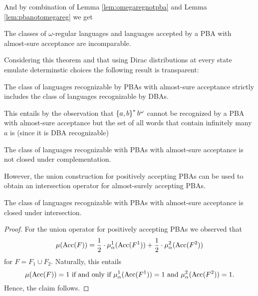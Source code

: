And by combination of Lemma \ref{lem:omegaregnotpba} and Lemma 
\ref{lem:pbanotomegareg} we get
\begin{theorem}
  \cite[Theorem 4, (b), (c)]{DecProblemsForProbAuto}
  The classes of $\omega$-regular languages and languages accepted by a 
  \ac{PBA} with almost-sure acceptance are incomparable.
  \label{thm:regalmostsureincomparable}
\end{theorem}
Considering this theorem and that using Dirac distributions at every state 
emulate determinstic choices the following result is transparent:
\begin{proposition}
  \cite[Proof of Theorem 4.4.9 (d)]{Groesser}
  The class of languages recognizable by \acp{PBA} with almost-sure acceptance
  strictly includes the class of languages recognizable by \acp{DBA}.
  \label{prop:pbasubsumesdba}
\end{proposition}
This entails by the observation that $\left\{a,b\right\}^{*}b^{\omega}$ cannot be 
recognized by a \ac{PBA} with almost-sure acceptance but the set of all words 
that contain infinitely many $a$ is (since it is \ac{DBA} recognizable)
\begin{proposition}
  \cite[Theorem 4.4.9 (d)]{Groesser}
  The class of languages recognizable with \acp{PBA} with almost-sure 
  acceptance is not closed under complementation.
  \label{prop:pba=1complement}
\end{proposition}
However, the union construction for positively accepting \acp{PBA} can be used
to obtain an intersection operator for almost-surely accepting \acp{PBA}.
\begin{proposition}
  \cite[Consequence of Section 4.3.]{Groesser}
  The class of languages recognizable with \acp{PBA} with almost-sure
  acceptance is closed under intersection.
\end{proposition}
\begin{proof}
  For the union operator for positively accepting \acp{PBA} we observed that
  \begin{equation*}
    \mu(\operatorname{Acc}(F)) = \frac{1}{2}\cdot\mu^{1}_{\alpha}(\operatorname{Acc}(F^{1})) +
      \frac{1}{2}\cdot\mu^{2}_{\alpha}(\operatorname{Acc}(F^{2}))
  \end{equation*}
  for $F = F_{1}\cup F_{2}$.
  Naturally, this entails
  \begin{equation*}
    \mu(\operatorname{Acc}(F)) = 1 \text{ if and only if } 
      \mu^{1}_{\alpha}(\operatorname{Acc}(F^{1})) = 1 
      \text{ and }
      \mu^{2}_{\alpha}(\operatorname{Acc}(F^{2})) = 1.
  \end{equation*}
  Hence, the claim follows.
\end{proof}

